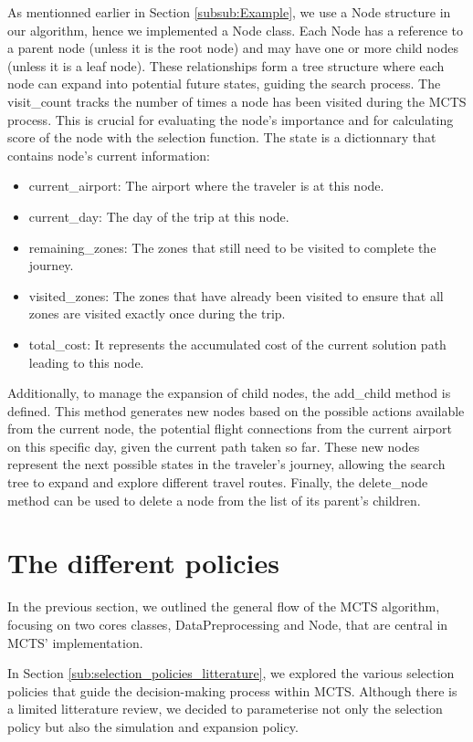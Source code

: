 As mentionned earlier in Section \ref{subsub:Example}, we use a Node structure in our algorithm, hence we implemented a Node class.
Each Node has a reference to a parent node (unless it is the root node) and may have one or more child nodes (unless it is a leaf node). These relationships form a tree structure where each node can expand into potential future states, guiding the search process.
The visit\_count tracks the number of times a node has been visited during the MCTS process. This is crucial for evaluating the node’s importance and for calculating score of the node with the selection function.
The state is a dictionnary that contains node's current information:
\begin{itemize}
    \item current\_airport: The airport where the traveler is  at this node.
    \item current\_day: The day of the trip at this node.
    \item remaining\_zones: The zones that still need to be visited to complete the journey.
    \item visited\_zones: The zones that have already been visited to ensure that all zones are visited exactly once during the trip.
    \item total\_cost: It represents the accumulated cost of the current solution path leading to this node.
\end{itemize}

Additionally, to manage the expansion of child nodes, the add\_child method is defined.
This method generates new nodes based on the possible actions available from the current node, the potential flight connections from the current airport on this specific day, given the current path taken so far. These new nodes represent the next possible states in the traveler’s journey, allowing the search tree to expand and explore different travel routes.
Finally, the delete\_node method can be used to delete a node from the list of its parent's children.


\section{The different policies}
In the previous section, we outlined the general flow of the MCTS algorithm, focusing on two cores classes, DataPreprocessing and Node, that are central in MCTS' implementation.

In Section \ref{sub:selection_policies_litterature}, we explored the various selection policies that guide the decision-making process within MCTS.
Although there is a limited litterature review, we decided to parameterise not only the selection policy but also the simulation and expansion policy.

